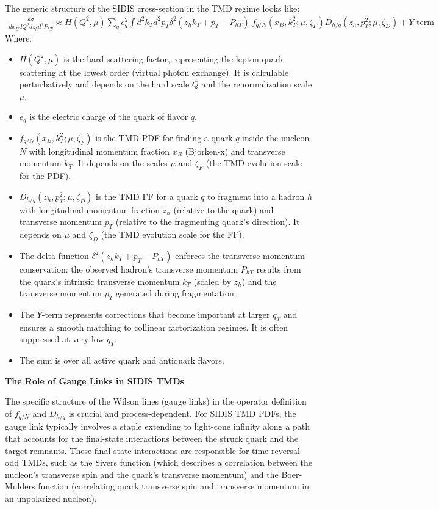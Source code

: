\documentclass[11pt]{article}
\begin{document}
The generic structure of the SIDIS cross-section in the TMD regime looks like:
\begin{align}
  \frac{d\sigma}{dx_B dQ^2 dz_h d^2P_{hT}} \approx H(Q^2, \mu) \sum_q e_q^2 \int d^2k_T d^2p_T \delta^2(z_h k_T + p_T - P_{hT})
  \
  f_{q/N}(x_B, k_T^2; \mu, \zeta_F) D_{h/q}(z_h, p_T^2; \mu, \zeta_D) + Y\text{-term}
  \label{eq:sidis_factorization}
\end{align}
Where:
\begin{itemize}
  \item $H(Q^2, \mu)$ is the hard scattering factor, representing the lepton-quark scattering at the lowest order (virtual photon exchange). It is calculable perturbatively and depends on the hard scale $Q$ and the renormalization scale $\mu$.
  \item $e_q$ is the electric charge of the quark of flavor $q$.
  \item $f_{q/N}(x_B, k_T^2; \mu, \zeta_F)$ is the TMD PDF for finding a quark $q$ inside the nucleon $N$ with longitudinal momentum fraction $x_B$ (Bjorken-x) and transverse momentum $k_T$. It depends on the scales $\mu$ and $\zeta_F$ (the TMD evolution scale for the PDF).
  \item $D_{h/q}(z_h, p_T^2; \mu, \zeta_D)$ is the TMD FF for a quark $q$ to fragment into a hadron $h$ with longitudinal momentum fraction $z_h$ (relative to the quark) and transverse momentum $p_T$ (relative to the fragmenting quark's direction). It depends on $\mu$ and $\zeta_D$ (the TMD evolution scale for the FF).
  \item The delta function $\delta^2(z_h k_T + p_T - P_{hT})$ enforces the transverse momentum conservation: the observed hadron's transverse momentum
        $P_{hT}$ results from the quark's intrinsic transverse momentum $k_T$ (scaled by $z_h$) and the transverse momentum $p_T$ generated during
        fragmentation.
  \item The $Y\text{-term}$ represents corrections that become important at larger $q_T$ and ensures a smooth matching to collinear factorization regimes. It
        is often suppressed at very low $q_T$.
  \item The sum is over all active quark and antiquark flavors.
\end{itemize}

\textbf{The Role of Gauge Links in SIDIS TMDs}

The specific structure of the Wilson lines (gauge links) in the operator definition of $f_{q/N}$ and $D_{h/q}$ is crucial and process-dependent. For
SIDIS TMD PDFs, the gauge link typically involves a staple extending to light-cone infinity along a path that accounts for the final-state
interactions between the struck quark and the target remnants. These final-state interactions are responsible for time-reversal odd TMDs, such as the
Sivers function (which describes a correlation between the nucleon's transverse spin and the quark's transverse momentum) and the Boer-Mulders
function (correlating quark transverse spin and transverse momentum in an unpolarized nucleon).
\end{document}
